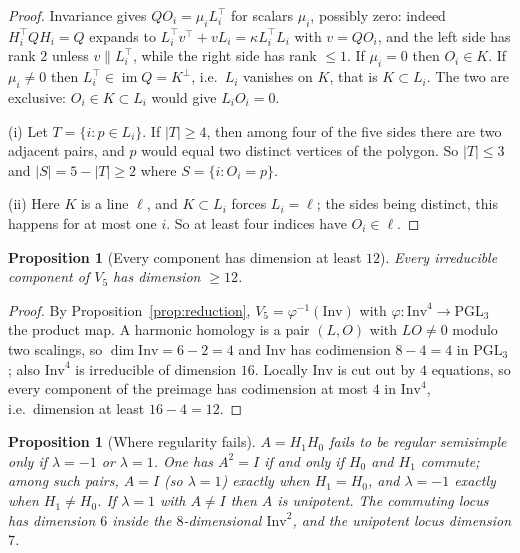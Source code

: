\documentclass[11pt,a4paper]{article}
\theoremstyle{plain}
\newtheorem{proposition}[theorem]{Proposition}
\theoremstyle{definition}
\theoremstyle{remark}
\newcommand{\PGL}{\mathrm{PGL}}
\begin{document}
\begin{proof}
Invariance gives $QO_i=\mu_iL_i^\top$ for scalars $\mu_i$, possibly zero: indeed
$H_i^\top QH_i=Q$ expands to $L_i^\top v^\top+vL_i=\kappa L_i^\top L_i$ with
$v=QO_i$, and the left side has rank $2$ unless $v\parallel L_i^\top$, while the
right side has rank $\le1$. If $\mu_i=0$ then $O_i\in K$. If $\mu_i\neq0$ then
$L_i^\top\in\operatorname{im}Q=K^{\perp}$, i.e.\ $L_i$ vanishes on $K$, that is
$K\subset L_i$. The two are exclusive: $O_i\in K\subset L_i$ would give
$L_iO_i=0$.

(i) Let $T=\{i: p\in L_i\}$. If $|T|\ge4$, then among four of the five sides there
are two adjacent pairs, and $p$ would equal two distinct vertices of the polygon.
So $|T|\le3$ and $|S|=5-|T|\ge2$ where $S=\{i:O_i=p\}$.

(ii) Here $K$ is a line $\ell$, and $K\subset L_i$ forces $L_i=\ell$; the sides
being distinct, this happens for at most one $i$. So at least four indices have
$O_i\in\ell$.
\end{proof}

\begin{proposition}[Every component has dimension at least $12$]\label{prop:krull}
Every irreducible component of $V_5$ has dimension $\ge12$.
\end{proposition}

\begin{proof}
By Proposition~\ref{prop:reduction}, $V_5=\varphi^{-1}(\mathrm{Inv})$ with
$\varphi:\mathrm{Inv}^4\to\PGL_3$ the product map. A harmonic homology is a pair
$(L,O)$ with $LO\neq0$ modulo two scalings, so $\dim\mathrm{Inv}=6-2=4$ and
$\mathrm{Inv}$ has codimension $8-4=4$ in $\PGL_3$; also $\mathrm{Inv}^4$ is
irreducible of dimension $16$. Locally $\mathrm{Inv}$ is cut out by $4$ equations,
so every component of the preimage has codimension at most $4$ in
$\mathrm{Inv}^4$, i.e.\ dimension at least $16-4=12$.
\end{proof}

\begin{proposition}[Where regularity fails]\label{prop:nonreg}
$A=H_1H_0$ fails to be regular semisimple only if $\lambda=-1$ or $\lambda=1$. One
has $A^2=I$ if and only if $H_0$ and $H_1$ commute; among such pairs, $A=I$
\textup{(}so $\lambda=1$\textup{)} exactly when $H_1=H_0$, and $\lambda=-1$ exactly
when $H_1\neq H_0$. If $\lambda=1$ with $A\neq I$ then $A$ is unipotent. The
commuting locus has dimension $6$ inside the $8$-dimensional $\mathrm{Inv}^2$, and
the unipotent locus dimension $7$.
\end{proposition}
\end{document}
